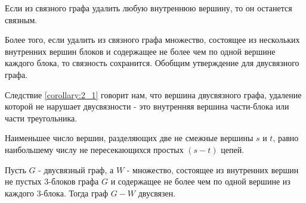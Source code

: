 Если из связного графа удалить любую внутреннюю вершину, то он останется связным.

Более того, если удалить из связного графа множество, состоящее из нескольких внутренних вершин блоков и содержащее не более чем по одной вершине каждого блока, то связность сохранится.
Обобщим утверждение для двусвязного графа.

Следствие \ref{corollary:2_1} говорит нам, что вершина двусвязного графа, удаление которой не нарушает двусвязности - это внутренняя вершина части-блока или части треугольника.

\begin{remrk} \label{theorem:menger}
	Наименьшее число вершин, разделяющих две не смежные вершины $s$ и  $t$, равно наибольшему числу не пересекающихся простых $(s - t)$ цепей.
\end{remrk}

\begin{thm}[Теорема 2.4] \label{theorem:2_4}
	Пусть $G$ - двусвязный граф, а $W$ - множество, состоящее из внутренних вершин не пустых 3-блоков графа  $G$ и содержащее не более чем по одной вершине из каждого 3-блока.
	Тогда граф  $G - W$ двусвязен.
\end{thm}

